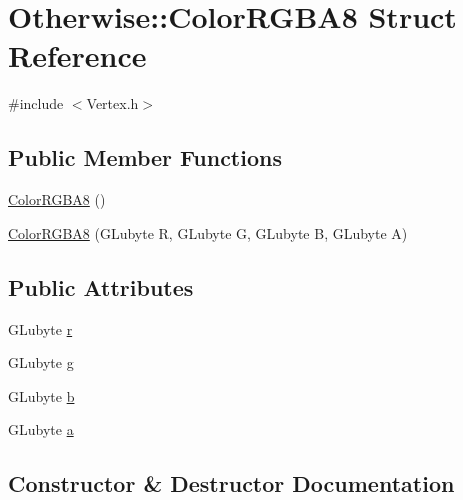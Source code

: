 \hypertarget{struct_otherwise_1_1_color_r_g_b_a8}{}\section{Otherwise\+:\+:Color\+R\+G\+B\+A8 Struct Reference}
\label{struct_otherwise_1_1_color_r_g_b_a8}


{\ttfamily \#include $<$Vertex.\+h$>$}

\subsection*{Public Member Functions}
\begin{DoxyCompactItemize}
\item 
\hyperlink{struct_otherwise_1_1_color_r_g_b_a8_ab113fe15a0f5d372b3d240c4fe5e714e}{Color\+R\+G\+B\+A8} ()
\item 
\hyperlink{struct_otherwise_1_1_color_r_g_b_a8_afe2faa06b87e9f6f1b5f8e8fd6c0ccbf}{Color\+R\+G\+B\+A8} (G\+Lubyte R, G\+Lubyte G, G\+Lubyte B, G\+Lubyte A)
\end{DoxyCompactItemize}
\subsection*{Public Attributes}
\begin{DoxyCompactItemize}
\item 
G\+Lubyte \hyperlink{struct_otherwise_1_1_color_r_g_b_a8_aa07f869363327444c1d99d0afb8bcd24}{r}
\item 
G\+Lubyte \hyperlink{struct_otherwise_1_1_color_r_g_b_a8_a941ae2f55381cb732e065274ab5a69a8}{g}
\item 
G\+Lubyte \hyperlink{struct_otherwise_1_1_color_r_g_b_a8_a022d814fb84da8197a4987e750c4a8eb}{b}
\item 
G\+Lubyte \hyperlink{struct_otherwise_1_1_color_r_g_b_a8_a90944625f45d120128703f2d0f8c2809}{a}
\end{DoxyCompactItemize}


\subsection{Constructor \& Destructor Documentation}
\mbox{\label{struct_otherwise_1_1_color_r_g_b_a8_ab113fe15a0f5d372b3d240c4fe5e714e}} 
